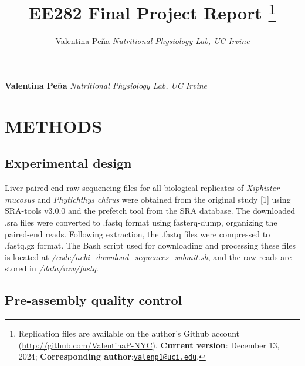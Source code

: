 \documentclass[12pt,]{article}
\title{EE282 Final Project Report \thanks{Replication files are
available on the author's Github account
(\url{http://github.com/ValentinaP-NYC}). \textbf{Current version}:
December 13, 2024; \textbf{Corresponding
author}:\href{mailto:valenp1@uci.edu}{\nolinkurl{valenp1@uci.edu}}.}  }
\author{\Large Valentina
Peña\vspace{0.05in} \newline\normalsize\emph{Nutritional Physiology Lab,
UC Irvine}  }
\date{}
\newcommand*{\authorfont}{\fontfamily{phv}\selectfont}
\begin{document}
	
%    


{%
\setlength{\parindent}{0pt}
\thispagestyle{plain}
{\fontsize{18}{20}\selectfont\raggedright 
\maketitle  %

}

{
   \vskip 13.5pt\relax \normalsize\fontsize{11}{12} 
\textbf{\authorfont Valentina Peña} \hskip 15pt \emph{\small Nutritional
Physiology Lab, UC Irvine}   

}

}






\vskip -8.5pt



\noindent  

\section{METHODS}\label{methods}

\subsection{Experimental design}\label{experimental-design}

Liver paired-end raw sequencing files for all biological replicates of
\emph{Xiphister mucosus} and \emph{Phytichthys chirus} were obtained
from the original study {[}1{]} using SRA-tools v3.0.0 and the prefetch
tool from the SRA database. The downloaded .sra files were converted to
.fastq format using fasterq-dump, organizing the paired-end reads.
Following extraction, the .fastq files were compressed to .fastq.gz
format. The Bash script used for downloading and processing these files
is located at \emph{/code/ncbi\_download\_sequences\_submit.sh}, and the
raw reads are stored in \emph{/data/raw/fastq}.

\subsection{Pre-assembly quality
control}\label{pre-assembly-quality-control}
\end{document}
